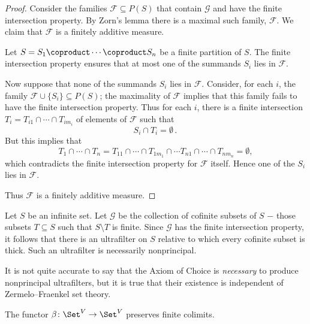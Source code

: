 \begin{proof}
	Consider the families $ \mathscr{F} \subseteq P(S) $
	that contain $ \mathscr{G} $ and
	have the finite intersection property.
	By Zorn's lemma there is a maximal such family, $ \mathscr{F} $.
	We claim that $ \mathscr{F} $ is a finitely additive measure.
	
	Let $ S = S_1 \coproduct \cdots \coproduct S_n $
	be a finite partition of $ S $.
	The finite intersection property ensures that
	at most one of the summands $ S_i $ lies in $ \mathscr{F} $.
	
	Now suppose that
	none of the summands $ S_i $ lies in $ \mathscr{F} $.
	Consider, for each $ i $,
	the family $ \mathscr{F} \cup \{ S_i \} \subseteq P(S) $;
	the maximality of $ \mathscr{F} $ implies that
	this family fails to have the finite intersection property. 
	Thus for each $ i $, there is a finite intersection
	$ T_i = T_{i1} \cap \cdots \cap T_{im_i} $
	of elements of $ \mathscr{F} $ such that 
	\[
		S_i \cap T_i = \emptyset \period
	\]
	But this implies that
	\[
		T_1 \cap \cdots \cap T_n = 
		T_{11} \cap \cdots \cap T_{1m_1} \cap
		\cdots
		T_{n1} \cap \cdots \cap T_{nm_n}
		= \emptyset \comma
	\]
	which contradicts the finite intersection property
	for $ \mathscr{F} $ itself.
	Hence one of the $ S_i $ lies in $ \mathscr{F} $.

	Thus $ \mathscr{F} $ is a finitely additive measure. 
\end{proof}

\begin{eg}
	Let $ S $ be an infinite set.
	Let $ \mathscr{G} $ be the collection of
	cofinite subsets of $ S $ −
	those subsets $ T \subseteq S $ such that
	$ S \setminus T $ is finite.
	Since $ \mathscr{G} $ has the finite intersection property,
	it follows that there is an ultrafilter on $ S $
	relative to which 
	every cofinite subset is thick.
	Such an ultrafilter is necessarily nonprincipal.
\end{eg}

\begin{nul}
	It is not quite accurate to say that
	the Axiom of Choice is \emph{necessary}
	to produce nonprincipal ultrafilters, but
	it is true that their existence is
	independent of Zermelo--Fraenkel set theory.
\end{nul}

\begin{proposition}
	The functor $ \beta \colon \Set^V \to \Set^V $
	preserves finite colimits.
\end{proposition}

